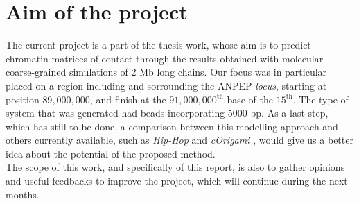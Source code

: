 \section{Aim of the project} \label{chap: aim}

The current project is a part of the thesis work, whose aim is to predict chromatin matrices of contact through the results obtained with molecular coarse-grained simulations of 2 Mb long chains. Our focus was in particular placed on a region including and sorrounding the ANPEP \textit{locus}, starting at position $89,000,000$, and finish at the $91,000,000^{\text{th}}$ base of the $15^\text{th}$. The type of system that was generated had beads incorporating 5000 bp.
As a last step, which has still to be done, a comparison between this modelling approach and others currently available, such as \textit{Hip-Hop} and \textit{cOrigami}
\cite{bucklePolymerSimulationsHeteromorphic2018,tanCelltypespecificPrediction3D2023},
would give us a better idea about the potential of the proposed method.\\
The scope of this work, and specifically of this report, is also to gather opinions and useful feedbacks to improve the project, which will continue during the next months.

